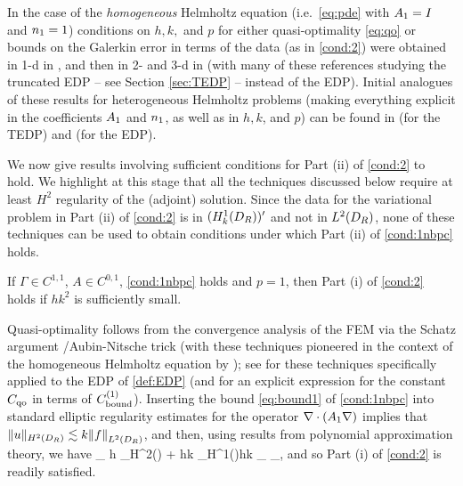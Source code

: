 In the case of the \emph{homogeneous} Helmholtz equation (i.e.~\cref{eq:pde} with $A_{1}= I$ and $n_{1}=1$) conditions on $h,k,$ and $p$ for either quasi-optimality \cref{eq:qo} or bounds on the Galerkin error in terms of the data (as in \cref{cond:2}) were obtained in 1-d in \cite{IhBa:95, IhBa:97}, and then in 2- and 3-d in \cite{Me:95, Sa:06, MeSa:10, MeSa:11, Wu:13, ZhWu:13, ChNi:18} (with many of these references studying the truncated EDP -- see Section \cref{sec:TEDP} -- instead of the EDP). 
Initial analogues of these results for heterogeneous Helmholtz problems (making everything explicit in the coefficients $A_{1}$ and $n_{1}$, as well as in $h, k$, and $p$) can be found in \cite{GrSa:18} (for the TEDP) and \cite{GaSpWu:18} (for the EDP).
 
We now give results involving sufficient conditions for Part (ii) of \cref{cond:2}  to hold. 
We highlight at this stage that all the techniques discussed below
require at least $H^2$ regularity of the (adjoint) solution. Since the data for the variational problem in Part (ii) of \cref{cond:2} is in $(\HokDR)'$ and not in $\LtDR$, none of these techniques can be used to obtain conditions under which Part (ii) of \cref{cond:1nbpc} holds.

\ble[Conditions under which Part (i) of \cref{cond:2} holds when $p=1$]\label{lem:hp1}
If $\Gamma\in C^{1,1}$, $A\in C^{0,1}$, \cref{cond:1nbpc} holds and $p=1$, then Part (i) of \cref{cond:2} holds
if $h k^2$ is sufficiently small. 
\ele

Quasi-optimality follows from the convergence analysis of the FEM via the Schatz argument \cite{Sc:74}/Aubin-Nitsche trick (with these techniques pioneered in the context of the homogeneous Helmholtz equation by \cite{Me:95, Sa:06, MeSa:10, MeSa:11}); see \cite[\S6]{GaSpWu:18} for these techniques specifically applied to the EDP of \cref{def:EDP} (and for an explicit expression for the constant $C_{\rm qo}$ in terms of $C_{\rm bound}^{(1)}$). 
Inserting the bound  \cref{eq:bound1} of \cref{cond:1nbpc} into standard elliptic regularity estimates for the operator $\nabla\cdot(A_{1}\nabla )$ implies that $\|u\|_{H^2(\DR)}\lesssim k\N{f}_{\LtDR}$, and then, using results from polynomial approximation theory, we have
 \beq\label{eq:AN1}
_{\HokDR} \lesssim h _{H^2(\DR)} + hk _{H^1(\DR)}\lesssim hk _{\LtDR} \lesssim {}_{\LtDR},
\eeq
and so Part (i) of \cref{cond:2} is readily satisfied.
\epf

